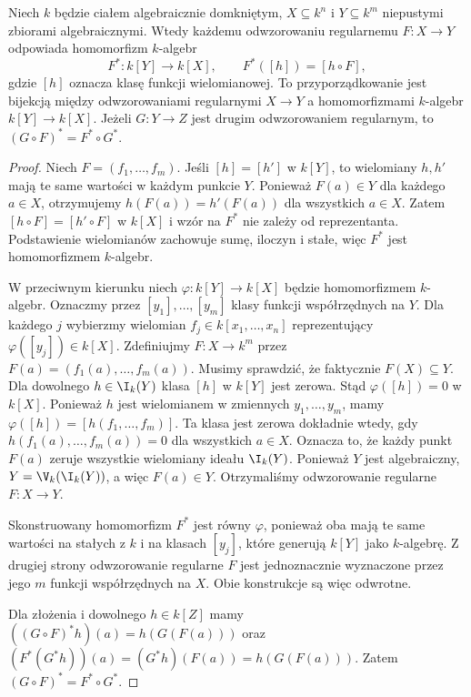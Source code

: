 \begin{twierdzenie}
\label{tw:affine-morphism}
Niech $k$ będzie ciałem algebraicznie domkniętym,
$X\subseteq k^n$ i $Y\subseteq k^m$ niepustymi zbiorami
algebraicznymi. Wtedy każdemu odwzorowaniu regularnemu
$F:X\to Y$ odpowiada homomorfizm $k$-algebr
\[
F^*:k[Y]\longrightarrow k[X],\qquad
F^*([h])=[h\circ F],
\]
gdzie $[h]$ oznacza klasę funkcji wielomianowej.
To przyporządkowanie jest bijekcją między
odwzorowaniami regularnymi $X\to Y$ a homomorfizmami
$k$-algebr $k[Y]\to k[X]$.
Jeżeli $G:Y\to Z$ jest drugim odwzorowaniem regularnym,
to $(G\circ F)^*=F^*\circ G^*$.
\end{twierdzenie}
\begin{proof}
Niech $F=(f_1,\dots,f_m)$.
Jeśli $[h]=[h']$ w $k[Y]$, to wielomiany $h,h'$ mają
te same wartości w każdym punkcie $Y$. Ponieważ $F(a)\in Y$
dla każdego $a\in X$, otrzymujemy
$h(F(a))=h'(F(a))$ dla wszystkich $a\in X$.
Zatem $[h\circ F]=[h'\circ F]$ w $k[X]$ i wzór na $F^*$
nie zależy od reprezentanta.
Podstawienie wielomianów zachowuje sumę, iloczyn i stałe,
więc $F^*$ jest homomorfizmem $k$-algebr.

W przeciwnym kierunku niech
$\varphi:k[Y]\to k[X]$ będzie homomorfizmem $k$-algebr.
Oznaczmy przez $[y_1],\dots,[y_m]$ klasy funkcji współrzędnych
na $Y$. Dla każdego $j$ wybierzmy wielomian
$f_j\in k[x_1,\dots,x_n]$ reprezentujący
$\varphi([y_j])\in k[X]$.
Zdefiniujmy $F:X\to k^m$ przez
$F(a)=(f_1(a),\dots,f_m(a))$.
Musimy sprawdzić, że faktycznie $F(X)\subseteq Y$.
Dla dowolnego $h\in\I_k(Y)$ klasa $[h]$ w $k[Y]$ jest zerowa.
Stąd $\varphi([h])=0$ w $k[X]$.
Ponieważ $h$ jest wielomianem w zmiennych $y_1,\dots,y_m$,
mamy $\varphi([h])=[h(f_1,\dots,f_m)]$.
Ta klasa jest zerowa dokładnie wtedy, gdy
$h(f_1(a),\dots,f_m(a))=0$ dla wszystkich $a\in X$.
Oznacza to, że każdy punkt $F(a)$ zeruje wszystkie wielomiany
ideału $\I_k(Y)$. Ponieważ $Y$ jest algebraiczny,
$Y=\V_k(\I_k(Y))$, a więc $F(a)\in Y$.
Otrzymaliśmy odwzorowanie regularne $F:X\to Y$.

Skonstruowany homomorfizm $F^*$ jest równy $\varphi$,
ponieważ oba mają te same wartości na stałych z $k$
i na klasach $[y_j]$, które generują $k[Y]$ jako $k$-algebrę.
Z drugiej strony odwzorowanie regularne $F$ jest jednoznacznie
wyznaczone przez jego $m$ funkcji współrzędnych na $X$.
Obie konstrukcje są więc odwrotne.

Dla złożenia i dowolnego $h\in k[Z]$ mamy
$((G\circ F)^*h)(a)=h(G(F(a)))$
oraz $(F^*(G^*h))(a)=(G^*h)(F(a))=h(G(F(a)))$.
Zatem $(G\circ F)^*=F^*\circ G^*$.
\end{proof}

